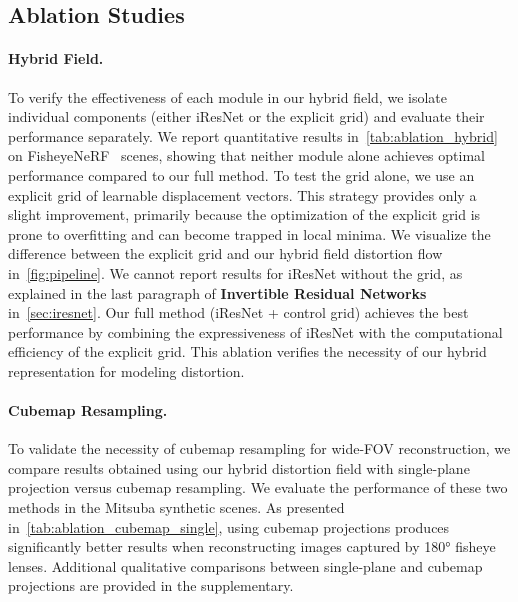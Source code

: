 \subsection{Ablation Studies}
\label{sec:ablation}

\paragraph{Hybrid Field.} To verify the effectiveness of each module in our hybrid field, we isolate individual components (either iResNet or the explicit grid) and evaluate their performance separately. We report quantitative results in~\cref{tab:ablation_hybrid} on FisheyeNeRF~\cite{jeong2021self} scenes, showing that neither module alone achieves optimal performance compared to our full method. To test the grid alone, we use an explicit grid of learnable displacement vectors. This strategy provides only a slight improvement, primarily because the optimization of the explicit grid is prone to overfitting and can become trapped in local minima. We visualize the difference between the explicit grid and our hybrid field distortion flow in~\cref{fig:pipeline}. We cannot report results for iResNet without the grid, as explained in the last paragraph of \textbf{Invertible Residual Networks} in~\cref{sec:iresnet}. Our full method (iResNet + control grid) achieves the best performance by combining the expressiveness of iResNet with the computational efficiency of the explicit grid. This ablation verifies the necessity of our hybrid representation for modeling distortion.




\paragraph{Cubemap Resampling.} To validate the necessity of cubemap resampling for wide-FOV reconstruction, we compare results obtained using our hybrid distortion field with single-plane projection versus cubemap resampling. 
We evaluate the performance of these two methods in the Mitsuba synthetic scenes.
As presented in~\cref{tab:ablation_cubemap_single}, using cubemap projections produces significantly better results when reconstructing images captured by 180\si{\degree} fisheye lenses.
Additional qualitative comparisons between single-plane and cubemap projections are provided in the supplementary.

